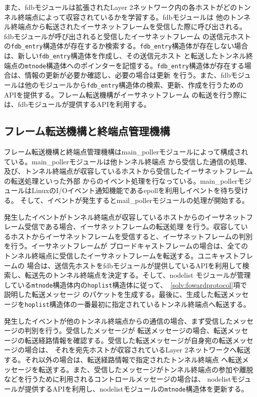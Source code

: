 また、fdbモジュールは拡張されたLayer 2ネットワーク内の各ホストがどのトンネル終端点によって収容されているかを学習する。fdbモジュールは
他のトンネル終端点から転送されたイーサネットフレームを受信した際に呼び出される。fdbモジュールが呼び出されると受信したイーサネットフレーム
の送信元ホストの\texttt{fdb\_entry}構造体が存在するか検索する。\texttt{fdb\_entry}構造体が存在しない場合は、新しい\texttt{fdb\_entry}構造体を作成し、その送信元ホスト
と転送したトンネル終端点の\texttt{mtnode}構造体へのポインターを記憶する。\texttt{fdb\_entry}構造体が存在する場合は、情報の更新が必要か確認し、必要の場合は更新
を行う。また、fdbモジュールは他のモジュールから\texttt{fdb\_entry}構造体の検索、更新、作成を行うためのAPIを提供する。フレーム転送機構がイーサネットフレーム
の転送を行う際には、fdbモジュールが提供するAPIを利用する。

\subsection{フレーム転送機構と終端点管理機構}
\label{solv:join}

フレーム転送機構と終端点管理機構はmain\_pollerモジュールによって構成されている。main\_pollerモジュールは他トンネル終端点
から受信した通信の処理、及び、トンネル終端点が収容しているホストから受信したイーサネットフレームの転送処理といった外部
からのイベント処理を行なっている。main\_pollerモジュールはLinuxのI/Oイベント通知機能であるepollを利用しイベントを待ち受ける。
そして、イベントが発生するとmail\_pollerモジュールの処理が開始する。

発生したイベントがトンネル終端点が収容しているホストからのイーサネットフレーム受信である場合、イーサネットフレームの転送処理
を行う。収容しているホストからイーサネットフレームを受信すると、イーサネットフレームの判別を行う。イーサネットフレームが
ブロードキャストフレームの場合は、全てのトンネル終端点に受信したイーサネットフレームを転送する。ユニキャストフレームの
場合は、送信先ホストをfdbモジュールが提供しているAPIを利用して検索し、転送先のトンネル終端点を決定する。そして、nodelist
モジュールが管理している\texttt{mtnode}構造体内の\texttt{hoplist}構造体に従って、~\ref{solv:fowardprotocol}項で説明した転送メッセージ
のパケットを生成する。最後に、生成した転送メッセージを\texttt{hoplist}構造体の一番最初に指定されているトンネル終端点へ転送する。

発生したイベントが他のトンネル終端点からの通信の場合、まず受信したメッセージの判別を行う。受信したメッセージが
転送メッセージの場合、転送メッセージの転送経路情報を確認する。受信した転送メッセージが自身宛の転送メッセージの場合は、
それを宛先ホストが収容されているLayer 2ネットワークへ転送する。それ以外の場合は、転送経路情報で指定されたトンネル終端点
へ転送メッセージを転送する。また、受信したメッセージがトンネル終端点の参加や離脱などを行うために利用されるコントロールメッセージの場合は、
nodelistモジュールが提供するAPIを利用し、nodelistモジュールの\texttt{mtnode}構造体を更新する。

